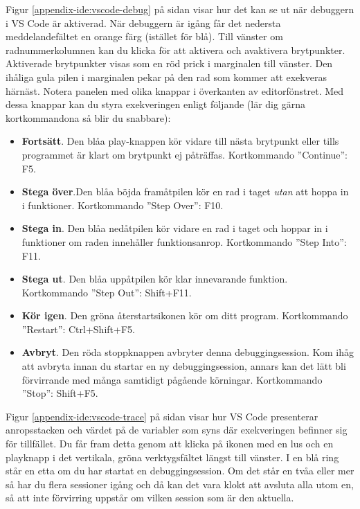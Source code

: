 Figur \ref{appendix-ide:vscode-debug} på sidan \pageref{appendix-ide:vscode-debug} visar hur det kan se ut när debuggern i VS Code är aktiverad. När debuggern är igång får det nedersta meddelandefältet en orange färg (istället för blå). Till vänster om radnummerkolumnen kan du klicka för att aktivera och avaktivera brytpunkter. Aktiverade brytpunkter visas som en röd prick i marginalen till vänster. Den ihåliga gula pilen i marginalen pekar på den rad som kommer att exekveras härnäst. Notera panelen med olika knappar i överkanten av editorfönstret. Med dessa knappar kan du styra exekveringen enligt följande (lär dig gärna kortkommandona så blir du snabbare):
\begin{itemize}
  \item \textbf{Fortsätt}. Den blåa play-knappen kör vidare till nästa brytpunkt eller tills programmet är klart om brytpunkt ej påträffas. Kortkommando ''Continue'': F5.
  \item \textbf{Stega över}.Den blåa böjda framåtpilen kör en rad i taget \emph{utan} att hoppa in i funktioner.  Kortkommando ''Step Over'': F10.
  \item \textbf{Stega in}. Den blåa nedåtpilen kör vidare en rad i taget och hoppar in i funktioner om raden innehåller funktionsanrop. Kortkommando ''Step Into'': F11.
  \item \textbf{Stega ut}. Den blåa uppåtpilen kör klar innevarande funktion. Kortkommando ''Step Out'': Shift+F11.
  \item \textbf{Kör igen}. Den gröna återstartsikonen kör om ditt program. Kortkommando ''Restart'': Ctrl+Shift+F5.
  \item \textbf{Avbryt}. Den röda stoppknappen avbryter denna debuggingsession. Kom ihåg att avbryta innan du startar en ny debuggingsession, annars kan det lätt bli förvirrande med många samtidigt pågående körningar. Kortkommando ''Stop'': Shift+F5. 
\end{itemize}

Figur \ref{appendix-ide:vscode-trace} på sidan \pageref{appendix-ide:vscode-trace} visar hur VS Code presenterar anropsstacken och värdet på de variabler som syns där exekveringen befinner sig för tillfället. Du får fram detta genom att klicka på ikonen med en lus och en playknapp i det vertikala, gröna verktygsfältet längst till vänster. I en blå ring står en etta om du har startat en debuggingsession. Om det står en tvåa eller mer så har du flera sessioner igång och då kan det vara klokt att avsluta alla utom en, så att inte förvirring uppstår om vilken session som är den aktuella. 

